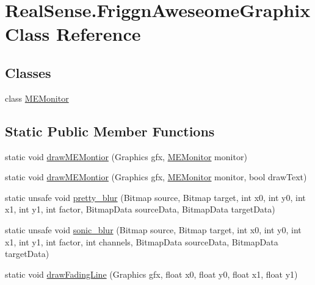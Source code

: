 \hypertarget{class_real_sense_1_1_friggn_aweseome_graphix}{}\section{Real\+Sense.\+Friggn\+Aweseome\+Graphix Class Reference}
\label{class_real_sense_1_1_friggn_aweseome_graphix}
\subsection*{Classes}
\begin{DoxyCompactItemize}
\item 
class \hyperlink{class_real_sense_1_1_friggn_aweseome_graphix_1_1_m_e_monitor}{M\+E\+Monitor}
\end{DoxyCompactItemize}
\subsection*{Static Public Member Functions}
\begin{DoxyCompactItemize}
\item 
static void \hyperlink{class_real_sense_1_1_friggn_aweseome_graphix_a9c50e2b0d08aa7fc1f45ef717a6af85a}{draw\+M\+E\+Montior} (Graphics gfx, \hyperlink{class_real_sense_1_1_friggn_aweseome_graphix_1_1_m_e_monitor}{M\+E\+Monitor} monitor)
\item 
static void \hyperlink{class_real_sense_1_1_friggn_aweseome_graphix_a25acb9a9102fc1c49ec141ea947acbe8}{draw\+M\+E\+Montior} (Graphics gfx, \hyperlink{class_real_sense_1_1_friggn_aweseome_graphix_1_1_m_e_monitor}{M\+E\+Monitor} monitor, bool draw\+Text)
\item 
static unsafe void \hyperlink{class_real_sense_1_1_friggn_aweseome_graphix_aaa75438fcc2f1f738744e6fda161e82b}{pretty\+\_\+blur} (Bitmap source, Bitmap target, int x0, int y0, int x1, int y1, int factor, Bitmap\+Data source\+Data, Bitmap\+Data target\+Data)
\item 
static unsafe void \hyperlink{class_real_sense_1_1_friggn_aweseome_graphix_a4ab59468a7284e0647b9814f6a0b2a57}{sonic\+\_\+blur} (Bitmap source, Bitmap target, int x0, int y0, int x1, int y1, int factor, int channels, Bitmap\+Data source\+Data, Bitmap\+Data target\+Data)
\item 
static void \hyperlink{class_real_sense_1_1_friggn_aweseome_graphix_a8aa4c7bc30a55548f69d9a6beeba102f}{draw\+Fading\+Line} (Graphics gfx, float x0, float y0, float x1, float y1)
\end{DoxyCompactItemize}
